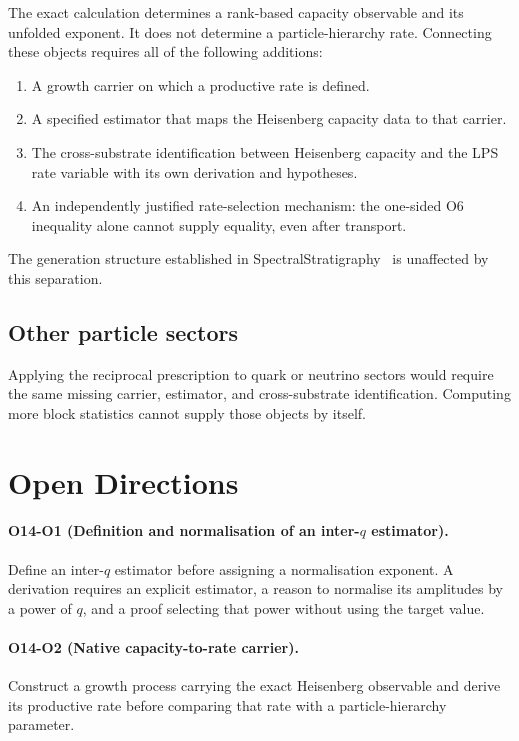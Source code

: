 \documentclass[11pt]{article}
\begin{document}
    The exact calculation determines a rank-based capacity observable and its unfolded exponent.
    It does not determine a particle-hierarchy rate.
    Connecting these objects requires all of the following additions:
    \begin{enumerate}
      \item A growth carrier on which a productive rate is defined.
      \item A specified estimator that maps the Heisenberg capacity data to that carrier.
      \item The cross-substrate identification between Heisenberg capacity and the LPS rate variable
      with its own derivation and hypotheses.
      \item An independently justified rate-selection mechanism: the one-sided O6 inequality alone
      cannot supply equality, even after transport.
    \end{enumerate}
    The generation structure established in SpectralStratigraphy~\cite{Beau2026a4} is unaffected by
    this separation.

  \subsection{Other particle sectors}
    \label{sec:quarks}

    Applying the reciprocal prescription to quark or neutrino sectors would require the same missing
    carrier, estimator, and cross-substrate identification.
    Computing more block statistics cannot supply those objects by itself.

  \section{Open Directions}
  \label{sec:open}

  \paragraph{O14-O1 (Definition and normalisation of an inter-$q$ estimator).}
    Define an inter-$q$ estimator before assigning a normalisation exponent.
    A derivation requires an explicit estimator, a reason to normalise its amplitudes by a power of
    $q$, and a proof selecting that power without using the target value.

  \paragraph{O14-O2 (Native capacity-to-rate carrier).}
    Construct a growth process carrying the exact Heisenberg observable and derive its productive
    rate before comparing that rate with a particle-hierarchy parameter.
\end{document}
